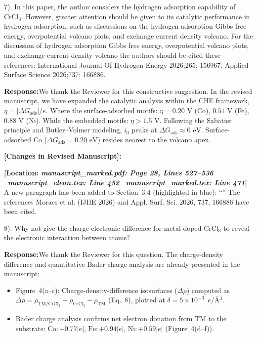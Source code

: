 \documentclass[11pt, sans, a4paper]{moderncv}
\newcommand{\response}{\vspace{0.4em}\noindent\textbf{\color{actionblue}Response:}\hspace{0.5em}}
\newcommand{\manuscriptchange}[1]{\vspace{0.4em}\noindent\textbf{\color{acsblue}[Changes in Revised Manuscript]:}\par\nopagebreak\vspace{0.15em}#1\vspace{0.4em}}
\begin{document}
\vspace{0.8em}

\begin{reviewercomment}
7). In this paper, the author considers the hydrogen adsorption capability of $\text{CrCl}_3$. However, greater attention should be given to its catalytic performance in hydrogen adsorption, such as discussions on the hydrogen adsorption Gibbs free energy, overpotential volcano plots, and exchange current density volcano. For the discussion of hydrogen adsorption Gibbs free energy, overpotential volcano plots, and exchange current density volcano the authors should be cited these references: International Journal Of Hydrogen Energy 2026;265: 156967. Applied Surface Science 2026;737: 166886.
\end{reviewercomment}

\response We thank the Reviewer for this constructive suggestion. In the revised manuscript, we have expanded the catalytic analysis within the CHE framework, $\eta = |\Delta G_{\mathrm{ads}}|/e$. Where the surface-adsorbed motifs: $\eta = 0.20\text{ V}$ (Co), $0.51\text{ V}$ (Fe), $0.88\text{ V}$ (Ni). While the embedded motifs: $\eta > 1.5\text{ V}$. Following the Sabatier principle and Butler--Volmer modeling, $i_0$ peaks at $\Delta G_{\mathrm{ads}} \approx 0\text{ eV}$. Surface-adsorbed Co ($\Delta G_{\mathrm{ads}} = 0.20\text{ eV}$) resides nearest to the volcano apex.

\manuscriptchange{\textbf{[Location: \textit{manuscript\_marked.pdf: Page 28, Lines 527--536} \textbar\ \textit{manuscript\_clean.tex: Line 452} \textbar\ \textit{manuscript\_marked.tex: Line 471}]}\\ A new paragraph has been added to Section~3.4 (highlighted in blue): ``{\itshape \ExecuteMetaData[manuscript_marked.tex]{OverpotentialHER}}'' The references Moraes et al. (IJHE 2026) and Appl. Surf. Sci. 2026, 737, 166886 have been cited.}

\vspace{0.8em}

\begin{reviewercomment}
8). Why not give the charge electronic difference for metal-doped $\text{CrCl}_3$ to reveal the electronic interaction between atoms?
\end{reviewercomment}

\response We thank the Reviewer for this question. The charge-density difference and quantitative Bader charge analysis are already presented in the manuscript:
\begin{itemize}[leftmargin=1.5em, itemsep=0.2em]
\item Figure~4(a--c): Charge-density-difference isosurfaces ($\Delta\rho$) computed as $\Delta\rho = \rho_{\mathrm{TM}/\mathrm{CrCl}_3} - \rho_{\mathrm{CrCl}_3} - \rho_{\mathrm{TM}}$ (Eq.~8), plotted at $\delta=5\times10^{-3}$~$e$/\AA$^{3}$.
\item Bader charge analysis confirms net electron donation from TM to the substrate: $\text{Co}: +0.77|e|$, $\text{Fe}: +0.94|e|$, $\text{Ni}: +0.59|e|$ (Figure~4(d--f)).
\end{itemize}
\end{document}
